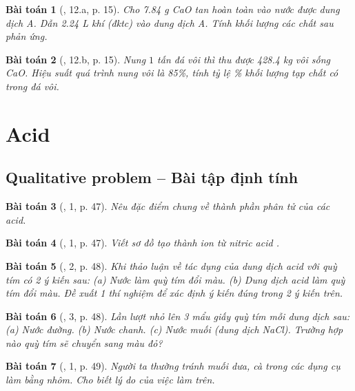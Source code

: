 \documentclass{article}
\newtheorem{baitoan}{Bài toán}
\begin{document}
\begin{baitoan}[\cite{An_350_BT_Hoa_Hoc_9}, 12.a, p. 15]
	Cho \emph{7.84 g CaO} tan hoàn toàn vào nước được dung dịch A. Dẫn \emph{2.24 L} khí \emph{} (đktc) vào dung dịch A. Tính khối lượng các chất sau phản ứng.
\end{baitoan}

\begin{baitoan}[\cite{An_350_BT_Hoa_Hoc_9}, 12.b, p. 15]
	Nung $1$ tấn đá vôi thì thu được \emph{428.4 kg} vôi sống \emph{CaO}. Hiệu suất quá trình nung vôi là \emph{85\%}, tính tỷ lệ \emph{\%} khối lượng tạp chất có trong đá vôi.
\end{baitoan}


\section{Acid}

\subsection{Qualitative problem -- Bài tập định tính}

\begin{baitoan}[\cite{SGK_KHTN_8_Canh_Dieu}, 1, p. 47]
	Nêu đặc điểm chung về thành phần phân tử của các acid.
\end{baitoan}

\begin{baitoan}[\cite{SGK_KHTN_8_Canh_Dieu}, 1, p. 47]
	Viết sơ đồ tạo thành ion \emph{} từ nitric acid \emph{}.
\end{baitoan}

\begin{baitoan}[\cite{SGK_KHTN_8_Canh_Dieu}, 2, p. 48]
	Khi thảo luận về tác dụng của dung dịch acid với quỳ tím có 2 ý kiến sau: (a) Nước làm quỳ tím đổi màu. (b) Dung dịch acid làm quỳ tím đổi màu. Đề xuất 1 thí nghiệm để xác định ý kiến đúng trong 2 ý kiến trên.
\end{baitoan}

\begin{baitoan}[\cite{SGK_KHTN_8_Canh_Dieu}, 3, p. 48]
	Lần lượt nhỏ lên 3 mẩu giấy quỳ tím mỗi dung dịch sau: (a) Nước đường. (b) Nước chanh. (c) Nước muối (dung dịch \emph{NaCl}). Trường hợp nào quỳ tím sẽ chuyển sang màu đỏ?
\end{baitoan}

\begin{baitoan}[\cite{SGK_KHTN_8_Canh_Dieu}, 1, p. 49]
	Người ta thường tránh muối dưa, cà trong các dụng cụ làm bằng nhôm. Cho biết lý do của việc làm trên.
\end{baitoan}
\end{document}
